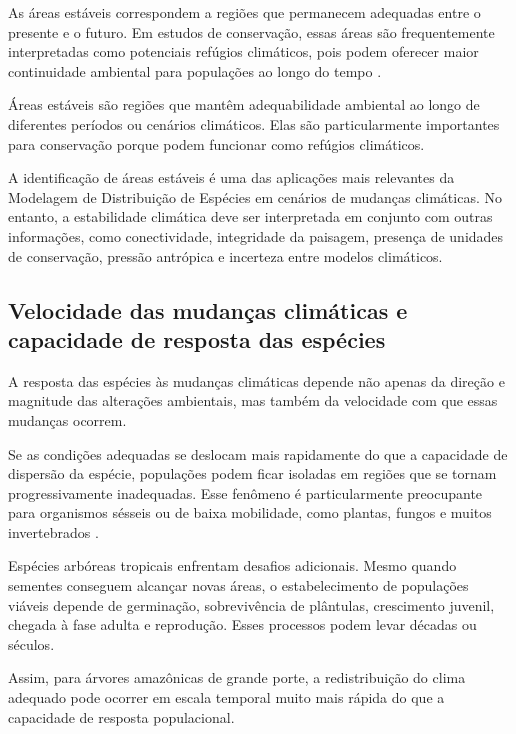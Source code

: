 As áreas estáveis correspondem a regiões que permanecem adequadas entre o presente e o futuro. Em estudos de conservação, essas áreas são frequentemente interpretadas como potenciais refúgios climáticos, pois podem oferecer maior continuidade ambiental para populações ao longo do tempo \parencite{ashcroft2010}.

\begin{conceito}
	Áreas estáveis são regiões que mantêm adequabilidade ambiental ao longo de diferentes períodos ou cenários climáticos. Elas são particularmente importantes para conservação porque podem funcionar como refúgios climáticos.
\end{conceito}

A identificação de áreas estáveis é uma das aplicações mais relevantes da Modelagem de Distribuição de Espécies em cenários de mudanças climáticas. No entanto, a estabilidade climática deve ser interpretada em conjunto com outras informações, como conectividade, integridade da paisagem, presença de unidades de conservação, pressão antrópica e incerteza entre modelos climáticos.

\subsection{Velocidade das mudanças climáticas e capacidade de resposta das espécies}

A resposta das espécies às mudanças climáticas depende não apenas da direção e magnitude das alterações ambientais, mas também da velocidade com que essas mudanças ocorrem.

Se as condições adequadas se deslocam mais rapidamente do que a capacidade de dispersão da espécie, populações podem ficar isoladas em regiões que se tornam progressivamente inadequadas. Esse fenômeno é particularmente preocupante para organismos sésseis ou de baixa mobilidade, como plantas, fungos e muitos invertebrados \parencite{loarie2009}.

Espécies arbóreas tropicais enfrentam desafios adicionais. Mesmo quando sementes conseguem alcançar novas áreas, o estabelecimento de populações viáveis depende de germinação, sobrevivência de plântulas, crescimento juvenil, chegada à fase adulta e reprodução. Esses processos podem levar décadas ou séculos.

Assim, para árvores amazônicas de grande porte, a redistribuição do clima adequado pode ocorrer em escala temporal muito mais rápida do que a capacidade de resposta populacional.

